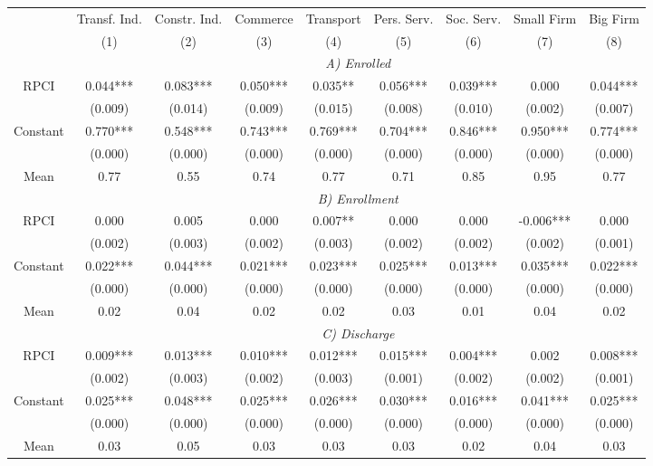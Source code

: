 \begin{tabular}{ccccccccc}
\toprule
\toprule
      & Transf. Ind. & Constr. Ind. & Commerce & Transport & Pers. Serv. & Soc. Serv. & Small Firm & Big Firm \\
      & (1)   & (2)   & (3)   & (4)   & (5)   & (6)   & (7)   & (8) \\
\cmidrule{2-9}      & \multicolumn{8}{c}{\textit{A) Enrolled}} \\
\midrule
RPCI  & 0.044*** & 0.083*** & 0.050*** & 0.035** & 0.056*** & 0.039*** & 0.000 & 0.044*** \\
      & (0.009) & (0.014) & (0.009) & (0.015) & (0.008) & (0.010) & (0.002) & (0.007) \\
Constant & 0.770*** & 0.548*** & 0.743*** & 0.769*** & 0.704*** & 0.846*** & 0.950*** & 0.774*** \\
      & (0.000) & (0.000) & (0.000) & (0.000) & (0.000) & (0.000) & (0.000) & (0.000) \\
Mean  & 0.77  & 0.55  & 0.74  & 0.77  & 0.71  & 0.85  & 0.95  & 0.77 \\
\cmidrule{2-9}      & \multicolumn{8}{c}{\textit{B) Enrollment}} \\
\midrule
RPCI  & 0.000 & 0.005 & 0.000 & 0.007** & 0.000 & 0.000 & -0.006*** & 0.000 \\
      & (0.002) & (0.003) & (0.002) & (0.003) & (0.002) & (0.002) & (0.002) & (0.001) \\
Constant & 0.022*** & 0.044*** & 0.021*** & 0.023*** & 0.025*** & 0.013*** & 0.035*** & 0.022*** \\
      & (0.000) & (0.000) & (0.000) & (0.000) & (0.000) & (0.000) & (0.000) & (0.000) \\
Mean  & 0.02  & 0.04  & 0.02  & 0.02  & 0.03  & 0.01  & 0.04  & 0.02 \\
\cmidrule{2-9}      & \multicolumn{8}{c}{\textit{C) Discharge}} \\
\midrule
RPCI  & 0.009*** & 0.013*** & 0.010*** & 0.012*** & 0.015*** & 0.004*** & 0.002 & 0.008*** \\
      & (0.002) & (0.003) & (0.002) & (0.003) & (0.001) & (0.002) & (0.002) & (0.001) \\
Constant & 0.025*** & 0.048*** & 0.025*** & 0.026*** & 0.030*** & 0.016*** & 0.041*** & 0.025*** \\
      & (0.000) & (0.000) & (0.000) & (0.000) & (0.000) & (0.000) & (0.000) & (0.000) \\
Mean  & 0.03  & 0.05  & 0.03  & 0.03  & 0.03  & 0.02  & 0.04  & 0.03 \\

\end{tabular}
